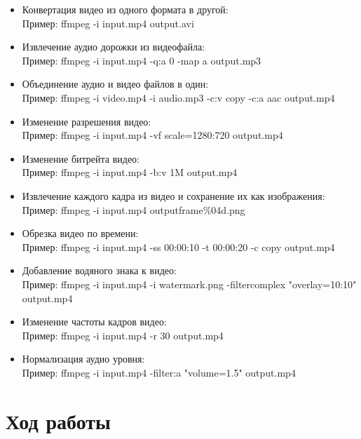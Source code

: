 \documentclass[12pt,a4paper]{scrartcl}
\begin{document}
\begin{itemize}
    \item Конвертация видео из одного формата в другой: \\
        Пример: ffmpeg -i input.mp4 output.avi
    \item Извлечение аудио дорожки из видеофайла:\\
        Пример: ffmpeg -i input.mp4 -q:a 0 -map a output.mp3
    \item Объединение аудио и видео файлов в один:\\
        Пример: ffmpeg -i video.mp4 -i audio.mp3 -c:v copy -c:a aac output.mp4
    \item  Изменение разрешения видео:\\
        Пример: ffmpeg -i input.mp4 -vf scale=1280:720 output.mp4
    \item  Изменение битрейта видео:\\
        Пример: ffmpeg -i input.mp4 -b:v 1M output.mp4
    \item  Извлечение каждого кадра из видео и сохранение их как изображения:\\
        Пример: ffmpeg -i input.mp4 output\textunderscore frame\textunderscore \%04d.png
    \item Обрезка видео по времени:\\
        Пример: ffmpeg -i input.mp4 -ss 00:00:10 -t 00:00:20 -c copy output.mp4
    \item Добавление водяного знака к видео:\\
        Пример: ffmpeg -i input.mp4 -i watermark.png -filter\textunderscore complex "overlay=10:10" output.mp4
    \item Изменение частоты кадров видео:\\
        Пример: ffmpeg -i input.mp4 -r 30 output.mp4
    \item Нормализация аудио уровня:\\
        Пример: ffmpeg -i input.mp4 -filter:a "volume=1.5" output.mp4
     
\end{itemize}

\section{Ход работы}
\end{document}
